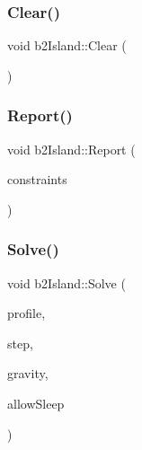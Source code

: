 \subsubsection{\texorpdfstring{Clear()}{Clear()}}
{\footnotesize\ttfamily void b2\+Island\+::\+Clear (\begin{DoxyParamCaption}{ }\end{DoxyParamCaption})\hspace{0.3cm}{\ttfamily [inline]}}

\mbox{\label{classb2_island_a57620f76faf000f61c76e925e40e6129}} 
\subsubsection{\texorpdfstring{Report()}{Report()}}
{\footnotesize\ttfamily void b2\+Island\+::\+Report (\begin{DoxyParamCaption}\item[{const \mbox{\hyperlink{structb2_contact_velocity_constraint}{b2\+Contact\+Velocity\+Constraint}} $\ast$}]{constraints }\end{DoxyParamCaption})}

\mbox{\label{classb2_island_a28a6f74174cde3a6e93663c740f418fa}} 
\subsubsection{\texorpdfstring{Solve()}{Solve()}}
{\footnotesize\ttfamily void b2\+Island\+::\+Solve (\begin{DoxyParamCaption}\item[{\mbox{\hyperlink{structb2_profile}{b2\+Profile}} $\ast$}]{profile,  }\item[{const \mbox{\hyperlink{structb2_time_step}{b2\+Time\+Step}} \&}]{step,  }\item[{const \mbox{\hyperlink{structb2_vec2}{b2\+Vec2}} \&}]{gravity,  }\item[{bool}]{allow\+Sleep }\end{DoxyParamCaption})}

\mbox{\label{classb2_island_a61f577b473962bb0d8add1f55eeef7ee}} 
